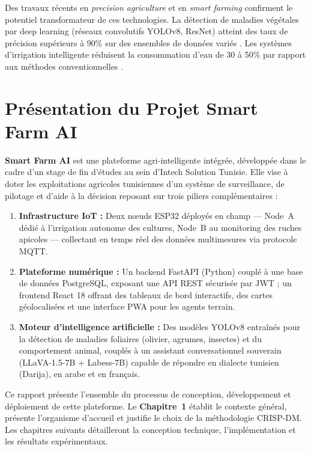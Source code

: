 \documentclass[12pt, a4paper]{report}
\begin{document}
Des travaux récents en \textit{precision agriculture} et en \textit{smart farming} confirment le potentiel transformateur de ces technologies. La détection de maladies végétales par deep learning (réseaux convolutifs YOLOv8, ResNet) atteint des taux de précision supérieurs à 90\% sur des ensembles de données variés \cite{mohanty2016}. Les systèmes d'irrigation intelligente réduisent la consommation d'eau de 30 à 50\% par rapport aux méthodes conventionnelles \cite{atzori2020}.

\section*{Présentation du Projet Smart Farm AI}

\textbf{Smart Farm AI} est une plateforme agri-intelligente intégrée, développée dans le cadre d'un stage de fin d'études au sein d'Intech Solution Tunisie. Elle vise à doter les exploitations agricoles tunisiennes d'un système de surveillance, de pilotage et d'aide à la décision reposant sur trois piliers complémentaires :

\begin{enumerate}[leftmargin=*, label=\textcolor{primary}{\textbf{\arabic*.}}]
    \item \textbf{Infrastructure IoT :} Deux nœuds ESP32 déployés en champ — Node~A dédié à l'irrigation autonome des cultures, Node~B au monitoring des ruches apicoles — collectant en temps réel des données multimesures via protocole MQTT.

    \item \textbf{Plateforme numérique :} Un backend FastAPI (Python) couplé à une base de données PostgreSQL, exposant une API REST sécurisée par JWT ; un frontend React 18 offrant des tableaux de bord interactifs, des cartes géolocalisées et une interface PWA pour les agents terrain.

    \item \textbf{Moteur d'intelligence artificielle :} Des modèles YOLOv8 entraînés pour la détection de maladies foliaires (olivier, agrumes, insectes) et du comportement animal, couplés à un assistant conversationnel souverain (LLaVA-1.5-7B + Labess-7B) capable de répondre en dialecte tunisien (Darija), en arabe et en français.
\end{enumerate}

Ce rapport présente l'ensemble du processus de conception, développement et déploiement de cette plateforme. Le \textbf{Chapitre~1} établit le contexte général, présente l'organisme d'accueil et justifie le choix de la méthodologie CRISP-DM. Les chapitres suivants détailleront la conception technique, l'implémentation et les résultats expérimentaux.
\end{document}
